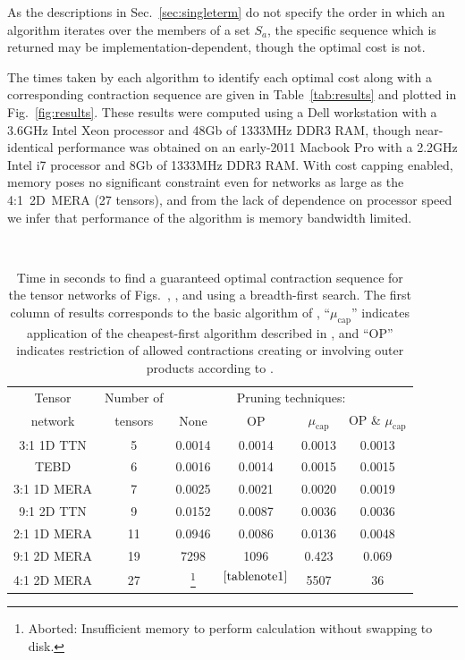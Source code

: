 \documentclass[aps,pre,reprint,superscriptaddress,amsfonts,amsmath,showpacs,nofootinbib,floatfix]{revtex4-1}
\newcommand{\mrm}[1]{\mathrm{#1}}
\newcommand{\fref}[1]{Fig.~\ref{#1}}
\newcommand{\tref}[1]{Table~\ref{#1}}
\newcommand{\sref}[1]{Sec.~\ref{#1}}
\newcommand{\psref}[1]{\protect{Sec.~\ref{#1}}}
\newcommand{\xicap}{{\mu_\mrm{cap}}}
\begin{document}
As the descriptions in \sref{sec:singleterm} do not specify the order in which an algorithm iterates over the members of a set $S_a$, the specific sequence which is returned may be implementation-dependent, though the optimal cost is not. %

The times taken by each algorithm to identify each optimal cost along with a corresponding contraction sequence are given in \tref{tab:results} and plotted in \fref{fig:results}. These results were computed 
using a Dell workstation with a 3.6GHz Intel Xeon processor and 48Gb of 1333MHz DDR3 RAM, %
though near-identical performance was obtained on an early-2011 Macbook Pro with a 2.2GHz Intel i7 processor and 8Gb of 1333MHz DDR3 RAM.%
With cost capping enabled, memory poses no significant constraint even for networks as large as the 4:1~2D~MERA (27 tensors), and from the lack of dependence on processor speed we infer that performance of the algorithm is memory bandwidth limited.
\begin{table}[bp]%
\caption{Time in seconds to find a guaranteed optimal contraction sequence for the tensor networks of Figs.~\protect{\ref{fig:31MERA}}, \protect{\ref{fig:1DTNs}}, and \protect{\ref{fig:2DTNs}}
using a breadth-first search. The first column of results corresponds to the basic algorithm of \psref{sec:breadthalg}, ``$\xicap$'' indicates application of the cheapest-first algorithm described in \psref{sec:costcap}, and ``OP'' indicates restriction of allowed contractions creating or involving outer products according to \psref{sec:restrictops}.\label{tab:results}}
~\\\begin{tabular}{|c|c|cccc|}
\hline
Tensor&Number of&\multicolumn{4}{c|}{Pruning techniques:}\\ %
network&tensors& None & OP & $\xicap$ & OP \& $\xicap$\\ \hline \hline
3:1 1D TTN  & 5& 0.0014  & 0.0014 & 0.0013 & 0.0013 \\
TEBD        & 6& 0.0016  & 0.0014 & 0.0015 & 0.0015 \\
3:1 1D MERA & 7& 0.0025  & 0.0021 & 0.0020 & 0.0019 \\
9:1 2D TTN  & 9& 0.0152  & 0.0087 & 0.0036 & 0.0036 \\
2:1 1D MERA &11& 0.0946  & 0.0086 & 0.0136 & 0.0048 \\
9:1 2D MERA &19&    7298 & 1096   & 0.423  & 0.069 \\
4:1 2D MERA &27& \footnote{Aborted: Insufficient memory to perform calculation without swapping to disk.\label{tablenote1}} & $^\mathrm{\protect{\ref{tablenote1}}}$ &   5507 & 36 \\ \hline
\end{tabular}
\end{table}%
\end{document}
